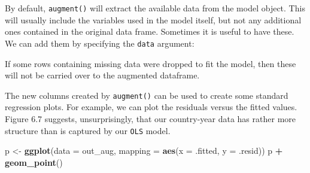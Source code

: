 \documentclass[]{book}
\newenvironment{Shaded}{\begin{snugshade}}{\end{snugshade}}
\newcommand{\CommentTok}[1]{\textcolor[rgb]{0.56,0.35,0.01}{\textit{#1}}}
\newcommand{\DataTypeTok}[1]{\textcolor[rgb]{0.13,0.29,0.53}{#1}}
\newcommand{\KeywordTok}[1]{\textcolor[rgb]{0.13,0.29,0.53}{\textbf{#1}}}
\newcommand{\NormalTok}[1]{#1}
\newcommand{\OperatorTok}[1]{\textcolor[rgb]{0.81,0.36,0.00}{\textbf{#1}}}
\newcommand{\StringTok}[1]{\textcolor[rgb]{0.31,0.60,0.02}{#1}}
\begin{document}
By default, \texttt{augment()} will extract the available data from the model object. This will usually include the variables used in the model itself, but not any additional ones contained in the original data frame. Sometimes it is useful to have these. We can add them by specifying the \texttt{data} argument:\\

\begin{Shaded}
\end{Shaded}

If some rows containing missing data were dropped to fit the model, then these will not be carried over to the augmented dataframe.

The new columns created by \texttt{augment()} can be used to create some standard regression plots. For example, we can plot the residuals versus the fitted values. Figure 6.7 suggests, unsurprisingly, that our country-year data has rather more structure than is captured by our \texttt{OLS} model.\\

\begin{Shaded}
\begin{Highlighting}[]
\NormalTok{p <-}\StringTok{ }\KeywordTok{ggplot}\NormalTok{(}\DataTypeTok{data =}\NormalTok{ out_aug,}
            \DataTypeTok{mapping =} \KeywordTok{aes}\NormalTok{(}\DataTypeTok{x =}\NormalTok{ .fitted, }\DataTypeTok{y =}\NormalTok{ .resid))}
\NormalTok{p }\OperatorTok{+}\StringTok{ }\KeywordTok{geom_point}\NormalTok{()}
\end{Highlighting}
\end{Shaded}
\end{document}
